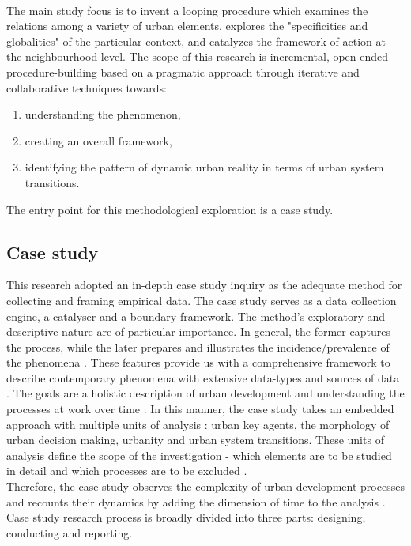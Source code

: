 \documentclass[11pt]{report}
\begin{document}
\\
The main study focus is to invent a looping procedure which examines the relations among a variety of urban elements, explores the "specificities and globalities" of the particular context, and catalyzes the framework of action at the neighbourhood level. The scope of this research is incremental, open-ended procedure-building based on a pragmatic approach through iterative and collaborative techniques towards:
\begin{enumerate}
\item understanding the phenomenon,
\item creating an overall framework,
\item identifying the pattern of dynamic urban reality in terms of urban system transitions. 
\end{enumerate} 

The entry point for this methodological exploration is a case study.

\subsection{Case study}

This research adopted an in-depth case study inquiry as the adequate method for collecting and framing empirical data. The case study serves as a data collection engine, a catalyser and a boundary framework. The method's exploratory and descriptive nature are of particular importance. In general, the former captures the process, while the later prepares and illustrates the incidence/prevalence of the phenomena \cite{(Yin 1994)}. These features provide us with a comprehensive framework to describe contemporary phenomena with extensive data-types and sources of data \cite{(Feagin, Orum and Sjoberg 1999)}. The goals are a holistic description of urban development and understanding the processes at work over time \cite{(Wanborn 2010)}. In this manner, the case study takes an embedded approach with multiple units of analysis \cite{(Scholz and Tietje, 2002; Yin 2009)}: urban key agents, the morphology of urban decision making, urbanity and urban system transitions. These units of analysis define the scope of the investigation - which elements are to be studied in detail and which processes are to be excluded \cite{(Harrison 2002)}.
\\

Therefore, the case study observes the complexity of urban development processes and recounts their dynamics by adding the dimension of time to the analysis \cite{(Feagin et al. 1991)}.
Case study research process is broadly divided into three parts: designing, conducting and reporting. 
\end{document}
